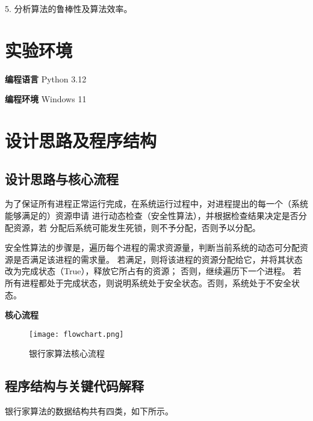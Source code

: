 \documentclass[12pt, a4paper, oneside]{ctexart}
\begin{document}
5. 分析算法的鲁棒性及算法效率。

\section{实验环境}

\textbf{编程语言} \quad Python 3.12

\textbf{编程环境} \quad Windows 11

\section{设计思路及程序结构}

\subsection{设计思路与核心流程}

为了保证所有进程正常运行完成，在系统运行过程中，对进程提出的每一个（系统能够满足的）资源申请
进行动态检查（安全性算法），并根据检查结果决定是否分配资源，若
分配后系统可能发生死锁，则不予分配，否则予以分配。

安全性算法的步骤是，遍历每个进程的需求资源量，判断当前系统的动态可分配资源是否满足该进程的需求量。
若满足，则将该进程的资源分配给它，并将其状态改为完成状态（True），释放它所占有的资源；
否则，继续遍历下一个进程。
若所有进程都处于完成状态，则说明系统处于安全状态。否则，系统处于不安全状态。

\textbf{核心流程}

\begin{figure}[H]
    \centering
    \texttt{[image: flowchart.png]}
    \caption{银行家算法核心流程}
    \label{fig:flowchart}
\end{figure}

\subsection{程序结构与关键代码解释}

银行家算法的数据结构共有四类，如下所示。
\end{document}
